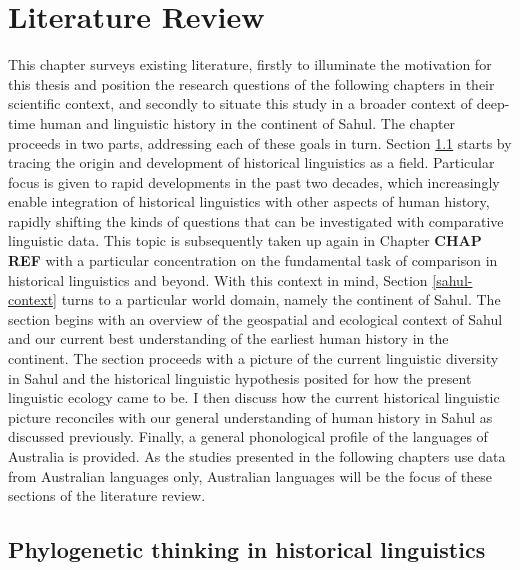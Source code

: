 \chapter[Literature review]{Literature Review}
\label{Chap:lit-review}


This chapter surveys existing literature, firstly to illuminate the motivation for this thesis and position the research questions of the following chapters in their scientific context, and secondly to situate this study in a broader context of deep-time human and linguistic history in the continent of Sahul. The chapter proceeds in two parts, addressing each of these goals in turn. Section \ref{academic-context} starts by tracing the origin and development of historical linguistics as a field. Particular focus is given to rapid developments in the past two decades, which increasingly enable integration of historical linguistics with other aspects of human history, rapidly shifting the kinds of questions that can be investigated with comparative linguistic data. This topic is subsequently taken up again in Chapter \textbf{CHAP REF} with a particular concentration on the fundamental task of comparison in historical linguistics and beyond. With this context in mind, Section \ref{sahul-context} turns to a particular world domain, namely the continent of Sahul. The section begins with an overview of the geospatial and ecological context of Sahul and our current best understanding of the earliest human history in the continent. The section proceeds with a picture of the current linguistic diversity in Sahul and the historical linguistic hypothesis posited for how the present linguistic ecology came to be. I then discuss how the current historical linguistic picture reconciles with our general understanding of human history in Sahul as discussed previously. Finally, a general phonological profile of the languages of Australia is provided. As the studies presented in the following chapters use data from Australian languages only, Australian languages will be the focus of these sections of the literature review.

\hypertarget{academic-context}{%
\section{Phylogenetic thinking in historical linguistics}\label{academic-context}}

